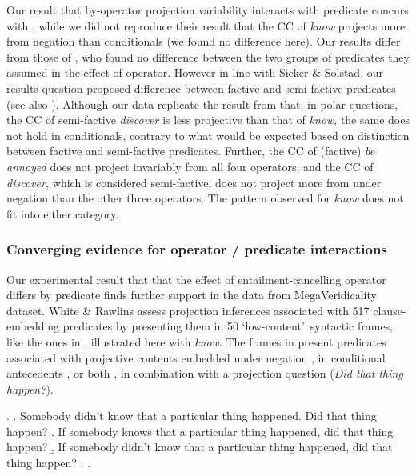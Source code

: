 \documentclass[a4paper,12pt,twoside]{article}
\begin{document}
			Our result that by-operator projection variability interacts with predicate concurs with \citet{smith_relationship_2014}, while we did not reproduce their result that the CC of \emph{know} projects more from negation than conditionals (we found no difference here). Our results differ from those of \citet{sieker_projective_2022}, who found no difference between the two groups of predicates they assumed in the effect of operator.
			However in line with Sieker \& Solstad, our results question  proposed difference between factive and semi-factive predicates (see also \citealt{beaver_have_2010}). Although our data replicate the result from \citet{tonhauser_how_2018} that, in polar questions, the CC of semi-factive \emph{discover} is less projective than that of \emph{know}, the same does not hold in conditionals, contrary to what would be expected based on  distinction between factive and semi-factive predicates.
			Further, the CC of (factive) \emph{be annoyed} does not project invariably from all four operators, and the CC of \emph{discover,}  which is considered semi-factive, does not project more from under negation than the other three operators. The pattern observed for {\em know} does not fit into either category.

		\subsubsection{Converging evidence for operator / predicate interactions}

			Our experimental result that that the effect of entailment-cancelling operator differs by predicate finds further support in the data from  MegaVeridicality dataset.
			White \& Rawlins assess projection inferences associated with 517 clause-embedding predicates by presenting them in 50 \lq low-content\rq\ syntactic frames, like the ones in \Next, illustrated here with \textit{know}. The frames in \Next present predicates associated with projective contents embedded under negation \Next[a], in conditional antecedents \Next[b], or both \Next[c], in combination with a projection question (\textit{Did that thing happen?}).

			\ex. \a. Somebody didn’t know that a particular thing happened. Did that thing happen?
				\b. If somebody knows that a particular thing happened, did that thing happen?
				\b. If somebody didn’t know that a particular thing happened, did that thing happen?
				\z.
			\z.
\end{document}
